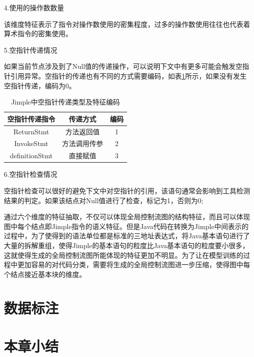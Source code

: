 4.使用的操作数数量

该维度特征表示了指令对操作数使用的密集程度，过多的操作数使用往往也代表着算术指令的密集使用。

5.空指针传递情况

如果当前节点涉及到了Null值的传递操作，可以说明下文中有更多可能会触发空指针引用异常。空指针的传递也有不同的方式需要编码，如表\ref{tab:table4-5}所示，如果没有发生空指针传递，编码为0。

\begin{table}[hb]
	\centering
	\caption{Jimple中空指针传递类型及特征编码} \label{tab:table4-5}
	\begin{tabular*}{0.9\textwidth}{@{\extracolsep{\fill}}ccc}
		\toprule
		空指针传递指令	&传递方式	&编码	 \\
		\midrule
		ReturnStmt & 方法返回值	& 1	\\
		InvokeStmt & 方法调用传参	& 2 \\
		definitionStmt & 直接赋值	&3 \\
		\bottomrule
	\end{tabular*}
\end{table}

6.空指针检查情况

空指针检查可以很好的避免下文中对空指针的引用，该语句通常会影响到工具检测结果的判定。如果该结点对Null值进行了检查，标记为1，否则为0;

通过六个维度的特征抽取，不仅可以体现全局控制流图的结构特征，而且可以体现图中每个结点即Jimple指令的语义特征。但是Java代码在转换为Jimple中间表示的过程中，为了使得到的语法单位都是标准的三地址表达式，将Java基本语句进行了大量的拆解重组，使得Jimple的基本语句的粒度比Java基本语句的粒度要小很多，这就使得生成的全局控制流图所能体现的特征更加不明显。为了让在模型训练的过程中更加容易的对代码分类，需要将生成的全局控制流图进一步压缩，使得图中每个结点接近基本块的维度。




\section{数据标注}
\section{本章小结}